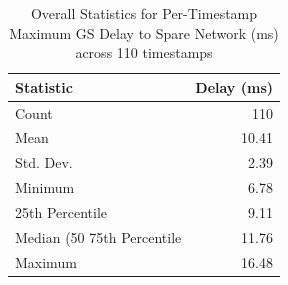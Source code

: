 \begin{table}[htbp]
\centering
\caption{Overall Statistics for Per-Timestamp Maximum GS Delay to Spare Network (ms) across 110 timestamps}
\label{tab:gs_delay_overall_max}
\begin{tabular}{lr}
\toprule
Statistic & Delay (ms) \\
\midrule
Count & 110 \\
Mean & 10.41 \\
Std. Dev. & 2.39 \\
Minimum & 6.78 \\
25th Percentile & 9.11 \\
Median (50%
75th Percentile & 11.76 \\
Maximum & 16.48 \\
\bottomrule
\end{tabular}
\end{table}
